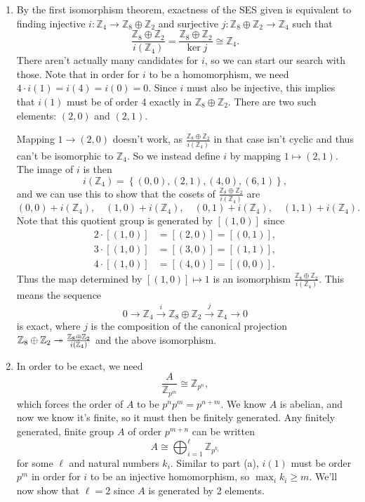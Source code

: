 \documentclass[twoside,10pt]{article}
\begin{document}
\begin{enumerate}
	\item By the first isomorphism theorem, exactness of the SES given is equivalent to finding injective $i:\mathbb{Z}_{4}\to \mathbb{Z}_{8}\oplus \mathbb{Z}_{2}$ and surjective $j:\mathbb{Z}_{8}\oplus \mathbb{Z}_{2}\to \mathbb{Z}_4$ such that
		\[
			\frac{\mathbb{Z}_{8}\oplus \mathbb{Z}_{2}}{i(\mathbb{Z}_{4})} = \frac{\mathbb{Z}_{8}\oplus \mathbb{Z}_{2}}{\ker j} \cong \mathbb{Z}_4.
		\] There aren't actually many candidates for $i$, so we can start our search with those. Note that in order for $i$ to be a homomorphism, we need $4 \cdot i(1) = i(4) = i(0) = 0$. Since $i$ must also be injective, this implies that $i(1)$ must be of order 4 exactly in $\mathbb{Z}_{8}\oplus \mathbb{Z}_{2}$. There are two such elements: $(2,0)$ and $(2,1)$.

		Mapping $1\to (2,0)$ doesn't work, as $\frac{\mathbb{Z}_{8}\oplus \mathbb{Z}_{2}}{i(\mathbb{Z}_4)} $ in that case isn't cyclic and thus can't be isomorphic to $\mathbb{Z}_4$. So we instead define $i$ by mapping $1 \mapsto (2,1)$. The image of $i$ is then
		\[
			i(\mathbb{Z}_{4}) = \left\{ (0,0), (2,1), (4,0), (6,1) \right\},
		\] and we can use this to show that the cosets of $\frac{\mathbb{Z}_{8}\oplus \mathbb{Z}_{2}}{i(\mathbb{Z}_4)} $ are
		\[
			(0,0)+i(\mathbb{Z}_{4}), \quad (1,0)+i(\mathbb{Z}_{4}), \quad (0,1)+i(\mathbb{Z}_{4}), \quad (1,1)+i(\mathbb{Z}_{4}).
		\] Note that this quotient group is generated by $[(1,0)]$ since
		\begin{align*}
			2 \cdot [(1,0)] &= [(2,0)] = [(0,1)], \\
			3 \cdot [(1,0)] &= [(3,0)] = [(1,1)], \\
			4 \cdot [(1,0)] &= [(4,0)] = [(0,0)].
		\end{align*}
		Thus the map determined by $[(1,0)] \mapsto 1$ is an isomorphism $\frac{\mathbb{Z}_{8}\oplus \mathbb{Z}_{2}}{i(\mathbb{Z}_4)}$. This means the sequence
		\[
		0 \to \mathbb{Z}_{4} \stackrel{i}{\to } \mathbb{Z}_{8}\oplus \mathbb{Z}_{2} \stackrel{j}{\to } \mathbb{Z}_{4}\to 0
		\] is exact, where $j$ is the composition of the canonical projection $\mathbb{Z}_{8}\oplus \mathbb{Z}_{2} \twoheadrightarrow \frac{\mathbb{Z}_{8}\oplus \mathbb{Z}_{2}}{i(\mathbb{Z}_4)}$ and the above isomorphism.

	\item In order to be exact, we need
		\[
		\frac{A}{\mathbb{Z}_{p^{m}}} \cong \mathbb{Z}_{p^{n}},
	\] which forces the order of $A$ to be $p^{n}p^{m}=p^{n+m}$. We know $A$ is abelian, and now we know it's finite, so it must then be finitely generated. Any finitely generated, finite group $A$ of order $p^{m+n}$ can be written
	\[
	A \cong \bigoplus_{i=1}^{\ell} \mathbb{Z}_{p^{k_i}}
\] for some $\ell $ and natural numbers $k_i$. Similar to part (a), $i(1)$ must be order $p^{m}$ in order for $i$ to be an injective homomorphism, so $\max_i k_i \geq m$. We'll now show that $\ell=2$ since $A$ is generated by 2 elements.


\end{enumerate}
\end{document}
